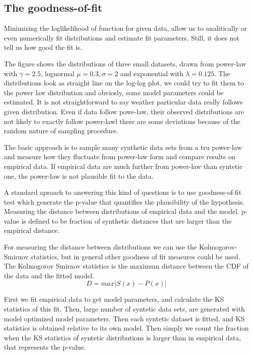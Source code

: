 \subsection{The goodness-of-fit}

Minimizing the loglikelihood of function for given data, allow us to analitically or even numerically fit distributions and estimate fit parameters. Still, it does not tell us how good the fit is. 

The figure shows the distributions of three small datasets, drawn from power-law with $\gamma=2.5$, lognormal $\mu=0.3, \sigma=2$ and exponential with $\lambda=0.125$. The distributions look as straight line on the log-log plot, we could try to fit them to the power law distribution and obviosly, some model parameters could be estimated. It is not straightforward to say weather particular data really follows given distribution. Even if data follow powe-law, their observed distributions are not likely to exactly follow power-lawl there are some deviations because of the random nature of sampling procedure. 

The basic approach is to sample many synthetic data sets from a tru power-law and measure how they fluctuate from power-law form and compare results on empirical data. If empirical data are much further from power-law than syntetic one, the power-law is not plausible fit to the data. 


A standard aproach to answering this kind of questions is to use goodness-of-fit test which generate the p-value that quantifies the plausibility of the hypothesis. Measuring the distance between distributions of empirical data and the model. p-value is defined to be fraction of synthetic distances that are larger than the empirical distance. 

For measuring the distance between distributions we can use the Kolmogorov-Smirnov statistics, but in general other goodness of fit measures could be used.
The Kolmogorov Smirnov statistics is the maximum distance between the CDF of the data and the fitted model.  
\begin{equation}
D = max |S(x) - P(x)|
\end{equation}

First we fit empirical data to get model parameters, and calculate the KS statistics of this fit. Then, large number of syntetic data sets, are generated with model optimized model parameters. Then each syntetic dataset is fitted, and KS statistics is obtained relative to its own model. Then simply we count the fraction when the KS statistics of syntetic distributions is larger than in empirical data, that represents the p-value. 

